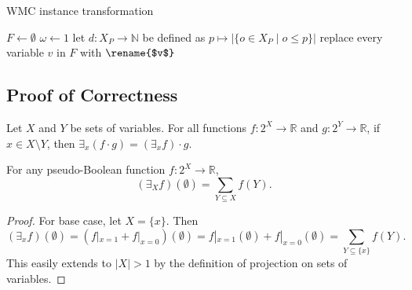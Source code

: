 \documentclass[runningheads]{llncs}
\begin{document}
\begin{algorithm}[t]
  \caption{WMC instance transformation}
  \label{alg:transformation}
  $F \gets \emptyset$\;
  $\omega \gets 1$\;
  let $d\colon X_P \to \mathbb{N}$ be defined as $p \mapsto |\{ o \in X_P \mid o
  \le p \}|$\;
  replace every variable $v$ in $F$ with $\rename{$v$}$\;
  \;
\end{algorithm}

\subsection{Proof of Correctness}

\begin{theorem} \label{thm:early}
  Let $X$ and $Y$ be sets of variables. For all functions $f\colon 2^X \to
  \mathbb{R}$ and $g\colon 2^Y \to \mathbb{R}$, if $x \in X \setminus Y$, then
  $\exists_x (f \cdot g) = (\exists_x f) \cdot g$.
\end{theorem}

\begin{lemma} \label{lemma:sum}
  For any pseudo-Boolean function $f\colon 2^X \to \mathbb{R}$,
  \[
    (\exists_X f)(\emptyset) = \sum_{Y \subseteq X} f(Y).
  \]
\end{lemma}
\begin{proof}
  For base case, let $X = \{x\}$. Then
  \[
    (\exists_xf)(\emptyset) = (f|_{x=1} + f|_{x=0})(\emptyset) =
    f|_{x=1}(\emptyset) + f|_{x=0}(\emptyset) = \sum_{Y \subseteq \{x\}} f(Y).
  \]
  This easily extends to $|X| > 1$ by the definition of projection on sets of
  variables.
\end{proof}
\end{document}
